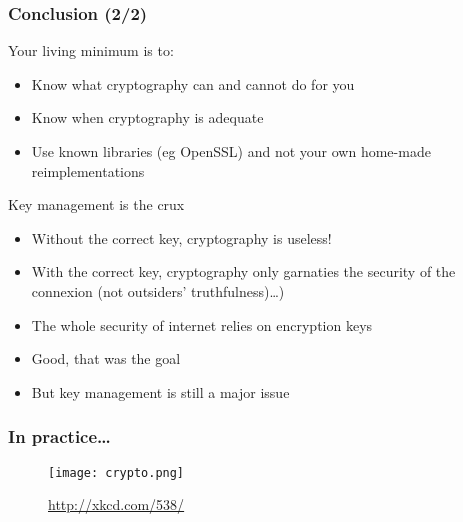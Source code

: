 \documentclass[
hyperref={pdfpagelabels=false}
,xcolor=table
]
{beamer}
\begin{document}
\begin{frame}
  \frametitle{Conclusion (2/2)}
\begin{block}{Your living minimum is to: }
	\begin{itemize}
		\item Know what cryptography can and cannot do for you
		\item Know when cryptography is adequate
		\item Use known libraries (eg OpenSSL) and not your own home-made reimplementations
	\end{itemize}	
\end{block}

\begin{block}{Key management is the crux}
	\begin{itemize}
		\item Without the correct key, cryptography is useless!
		\item With the correct key, cryptography only garnaties the security of the connexion (not outsiders' truthfulness)\ldots)
	\end{itemize}
\end{block}

\begin{block}{}
  \begin{itemize}
  \item The whole security of internet relies on encryption keys
  \item Good, that was the goal
  \item But key management is still a major issue
  \end{itemize}
\end{block}
\end{frame}



\begin{frame}
  \frametitle{In practice\ldots}
  \begin{figure}
	\centering
	\texttt{[image: crypto.png]}
	
	\url{http://xkcd.com/538/}
  \end{figure}
\end{frame}
\end{document}
